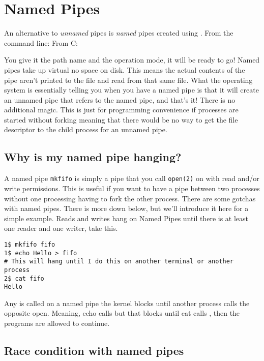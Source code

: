 \section{Named Pipes}

An alternative to \emph{unnamed} pipes is \emph{named} pipes created using .
From the command line:  From C: 

You give it the path name and the operation mode, it will be ready to go!
Named pipes take up virtual no space on disk.
This means the actual contents of the pipe aren't printed to the file and read from that same file.
What the operating system is essentially telling you when you have a named pipe is that it will create an unnamed pipe that refers to the named pipe, and that's it!
There is no additional magic.
This is just for programming convenience if processes are started without forking meaning that there would be no way to get the file descriptor to the child process for an unnamed pipe.

\subsection{Why is my named pipe hanging?}

A named pipe \texttt{mkfifo} is simply a pipe that you call \texttt{open(2)} on with read and/or write permissions.
This is useful if you want to have a pipe between two processes without one processing having to fork the other process.
There are some gotchas with named pipes.
There is more down below, but we'll introduce it here for a simple example.
Reads and writes hang on Named Pipes until there is at least one reader and one writer, take this.

\begin{verbatim}
1$ mkfifo fifo
1$ echo Hello > fifo
# This will hang until I do this on another terminal or another process
2$ cat fifo
Hello
\end{verbatim}

Any  is called on a named pipe the kernel blocks until another process calls the opposite open. Meaning, echo calls  but that blocks until cat calls , then the programs are allowed to continue.

\subsection{Race condition with named pipes}

